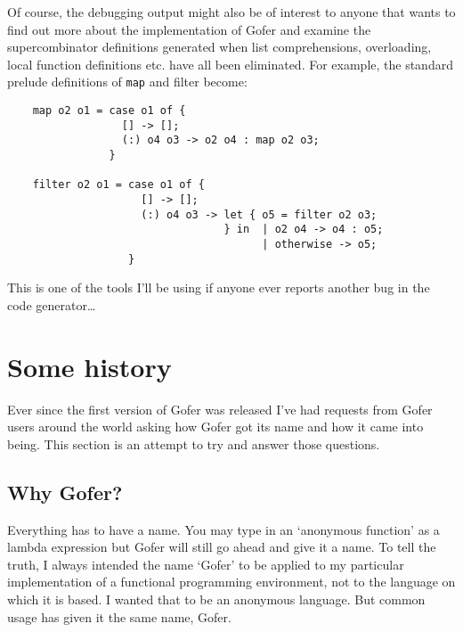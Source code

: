 Of course, the debugging output might also be of interest to anyone
that wants to find out more about the implementation of Gofer and
examine the supercombinator definitions generated when list
comprehensions, overloading, local function definitions etc.  have all
been eliminated.  For example, the standard prelude definitions of \verb"map"
and filter become:
\begin{verbatim}
    map o2 o1 = case o1 of {
                  [] -> [];
                  (:) o4 o3 -> o2 o4 : map o2 o3;
                }

    filter o2 o1 = case o1 of {
                     [] -> [];
                     (:) o4 o3 -> let { o5 = filter o2 o3;
                                  } in  | o2 o4 -> o4 : o5;
                                        | otherwise -> o5;
                   }
\end{verbatim}
This is one of the tools I'll be using if anyone ever reports another
bug in the code generator\dots


\section{Some history}

Ever since the first version of Gofer was released I've had requests
from Gofer users around the world asking how Gofer got its name and how
it came into being.  This section is an attempt to try and answer those
questions.

\subsection{Why Gofer?}
Everything has to have a name.  You may type in an `anonymous function'
as a lambda expression but Gofer will still go ahead and give it a
name.  To tell the truth, I always intended the name `Gofer' to be
applied to my particular implementation of a functional programming
environment, not to the language on which it is based.  I wanted that
to be an anonymous language.  But common usage has given it the same
name, Gofer.

